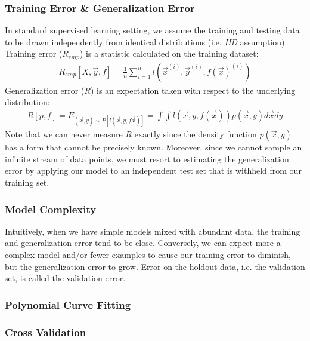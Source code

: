 \documentclass[a4paper,12pt]{article}
\theoremstyle{definition}
\begin{document}
    \subsubsection*{Training Error \& Generalization Error}
    In standard supervised learning setting, we assume the training and testing data to be drawn independently from
    identical distributions (i.e. \textit{IID} assumption).
    Training error ($R_{emp}$) is a statistic calculated on the training dataset:
    \begin{equation*}
        \begin{aligned}
           R_{emp}[X,\vec{y},f] = \frac{1}{n}\sum_{i=1}^{n}l(\vec{x}^{(i)},\vec{y}^{(i)},f(\vec{x})^{(i)})
        \end{aligned}
    \end{equation*}
    Generalization error ($R$) is an expectation taken with respect to the underlying distribution:
    \begin{equation*}
        \begin{aligned}
           R[p,f] = E_{(\vec{x},y)\sim P[l(\vec{x},y,f{\vec{x}})]} = \int\int l(\vec{x},y,f(\vec{x}))p(\vec{x},y)d\vec{x}dy
         \end{aligned}
    \end{equation*}
    Note that we can never measure $R$ exactly since the density function $p(\vec{x},y)$ has a form that cannot
    be precisely known. Moreover, since we cannot sample an infinite stream of data points, we must resort to estimating
    the generalization error by applying our model to an independent test set that is withheld from our training set.
    \subsubsection*{Model Complexity}
    Intuitively, when we have simple models mixed with abundant data, the training and generalization error tend to be close.
    Conversely, we can expect more a complex model and/or fewer examples to cause our training error to diminish, but the
    generalization error to grow. Error on the holdout data, i.e. the validation set, is called the validation error.
    
    \subsubsection*{Polynomial Curve Fitting}
    \subsubsection*{Cross Validation}
\end{document}
